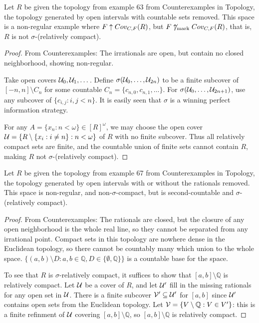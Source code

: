   \begin{example}
  Let $R$ be given the topology from example 63 from Counterexamples in Topology, the topology generated by open intervals with countable sets removed. This space is a non-regular example where $F \uparrow Cov_{C,F}(R)$, but $F \not\uparrow_{\text{mark}} Cov_{C,F}(R)$, that is, $R$ is not $\sigma$-(relatively compact).
  \end{example}

  \begin{proof}
  From Counterexamples: The irrationals are open, but contain no closed neighborhood, showing non-regular.

  Take open covers $\mathcal{U}_0,\mathcal{U}_1,\dots$. Define $\sigma(\mathcal{U}_0,\dots,\mathcal{U}_{2n})$ to be a finite subcover of $[-n,n]\setminus C_n$ for some countable $C_n=\{c_{n,0}, c_{n,1}, \dots\}$. For $\sigma(\mathcal{U}_0,\dots,\mathcal{U}_{2n+1})$, use any subcover of $\{c_{i,j} : i,j < n\}$. It is easily seen that $\sigma$ is a winning perfect information strategy.

  For any $A=\{x_n:n<\omega\} \in [R]^\omega$, we may choose the open cover $\mathcal{U} = \{R \setminus \{x_i: i \not= n\} : n < \omega \}$ of $R$ with no finite subcover. Thus all relatively compact sets are finite, and the countable union of finite sets cannot contain $R$, making $R$ not $\sigma$-(relatively compact).
  \end{proof}

  \begin{example}
  Let $R$ be given the topology from example 67 from Counterexamples in Topology, the topology generated by open intervals with or without the rationals removed. This space is non-regular, and non-$\sigma$-compact, but is second-countable and $\sigma$-(relatively compact).
  \end{example}

  \begin{proof}
  From Counterexamples: The rationals are closed, but the closure of any open neighborhood is the whole real line, so they cannot be separated from any irrational point. Compact sets in this topology are nowhere dense in the Euclidean topology, so there cannot be countably many which union to the whole space. $\{(a,b)\setminus D : a,b\in\mathbb{Q},D\in\{\emptyset,\mathbb{Q}\}\}$ is a countable base for the space.

  To see that $R$ is $\sigma$-relatively compact, it suffices to show that $[a,b]\setminus\mathbb{Q}$ is relatively compact. Let $\mathcal{U}$ be a cover of $R$, and let $\mathcal{U}'$ fill in the missing rationals for any open set in $\mathcal{U}$. There is a finite subcover $\mathcal{V}'\subseteq \mathcal{U}'$ for $[a,b]$ since $\mathcal{U}'$ contains open sets from the Euclidean topology. Let $\mathcal{V}= \{V\setminus\mathbb{Q}:V\in V'\}$: this is a finite refinment of $\mathcal{U}$ covering $[a,b]\setminus\mathbb{Q}$, so $[a,b]\setminus\mathbb{Q}$ is relatively compact.
  \end{proof}

